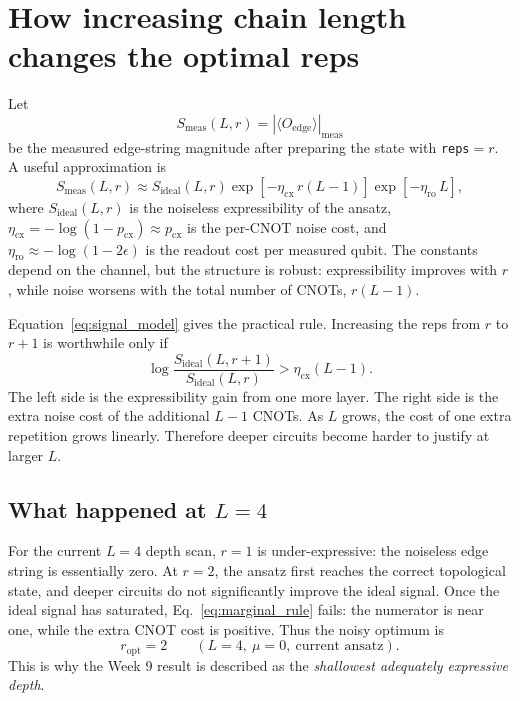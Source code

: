 \documentclass[11pt]{article}
\newcommand{\expv}[1]{\langle #1\rangle}
\begin{document}
\section{How increasing chain length changes the optimal reps}

Let
\begin{equation}
  S_{\mathrm{meas}}(L,r)
  =
  |\expv{O_{\mathrm{edge}}}|_{\mathrm{meas}}
\end{equation}
be the measured edge-string magnitude after preparing the state with
\texttt{reps}$=r$. A useful approximation is
\begin{equation}
  S_{\mathrm{meas}}(L,r)
  \approx
  S_{\mathrm{ideal}}(L,r)
  \exp[-\eta_{\mathrm{cx}}\,r(L-1)]
  \exp[-\eta_{\mathrm{ro}}\,L],
  \label{eq:signal_model}
\end{equation}
where $S_{\mathrm{ideal}}(L,r)$ is the noiseless expressibility of the ansatz,
$\eta_{\mathrm{cx}}=-\log(1-p_{\mathrm{cx}})\approx p_{\mathrm{cx}}$ is the
per-CNOT noise cost, and $\eta_{\mathrm{ro}}\approx -\log(1-2\epsilon)$ is the
readout cost per measured qubit. The constants depend on the channel, but the
structure is robust: expressibility improves with $r$, while noise worsens with
the total number of CNOTs, $r(L-1)$.

Equation~\eqref{eq:signal_model} gives the practical rule. Increasing the reps
from $r$ to $r+1$ is worthwhile only if
\begin{equation}
  \log\frac{S_{\mathrm{ideal}}(L,r+1)}
           {S_{\mathrm{ideal}}(L,r)}
  >
  \eta_{\mathrm{cx}}(L-1).
  \label{eq:marginal_rule}
\end{equation}
The left side is the expressibility gain from one more layer. The right side is
the extra noise cost of the additional $L-1$ CNOTs. As $L$ grows, the cost of one
extra repetition grows linearly. Therefore deeper circuits become harder to
justify at larger $L$.

\subsection*{What happened at $L=4$}

For the current $L=4$ depth scan, $r=1$ is under-expressive: the noiseless edge
string is essentially zero. At $r=2$, the ansatz first reaches the correct
topological state, and deeper circuits do not significantly improve the ideal
signal. Once the ideal signal has saturated, Eq.~\eqref{eq:marginal_rule} fails:
the numerator is near one, while the extra CNOT cost is positive. Thus the noisy
optimum is
\begin{equation}
  r_{\mathrm{opt}}=2
  \qquad
  (L=4,\ \mu=0,\ \text{current ansatz}).
\end{equation}
This is why the Week 9 result is described as the \emph{shallowest adequately
expressive depth}.
\end{document}
